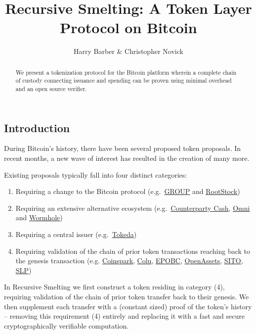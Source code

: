 \documentclass[9pt,oneside]{amsart}
\title{Recursive Smelting: A Token Layer Protocol on Bitcoin}
\author{Harry Barber \& Christopher Novick}
\begin{document}
\begin{abstract}
    We present a tokenization protocol for the Bitcoin platform wherein a complete chain of custody connecting issuance and spending can be proven using minimal overhead and an open source verifier.
\end{abstract}
\maketitle
\begin{multicols}{2}


\section{Introduction}
During Bitcoin's history, there have been several proposed token proposals. In recent months, a new wave of interest has resulted in the creation of many more.

Existing proposals typically fall into four distinct categories: \begin{enumerate}
    \item Requiring a change to the Bitcoin protocol (e.g.\ \href{https://docs.google.com/document/d/1X-yrqBJNj6oGPku49krZqTMGNNEWnUJBRFjX7fJXvTs}{GROUP} and \href{https://en.wikipedia.org/wiki/RootStock}{RootStock})
    \item Requiring an extensive alternative ecosystem (e.g.\ \href{https://counterparty.io/docs/protocol_specification/}{Counterparty Cash}, \href{https://github.com/OmniLayer/spec}{Omni} and \href{http://wormhole.cash}{Wormhole})
    \item Requiring a central issuer (e.g.\ \href{http://media.lokad.com/bitcoin/tokeda-2018-04-30.pdf}{Tokeda})
    \item Requiring validation of the chain of prior token transactions reaching back to the genesis transaction (e.g.
    \href{http://coinspark.org/}{Coinspark},
    \href{https://github.com/Colored-Coins/Colored-Coins-Protocol-Specification}{Colu},
    \href{https://github.com/chromaway/ngcccbase/wiki/EPOBC_simple}{EPOBC},
	\href{https://github.com/OpenAssets/open-assets-protocol/blob/master/specification.mediawiki}{OpenAssets},
   \href{https://github.com/awemany/sito}{SITO},
     \href{https://github.com/simpleledger/simple-ledger-protocol}{SLP})
\end{enumerate}

In Recursive Smelting we first construct a token residing in category (4), requiring validation of the chain of prior token transfer back to their genesis. We then supplement each transfer with a (constant sized) proof of the token's history -- removing this requirement (4) entirely and replacing it with a fast and secure cryptographically verifiable computation.


\end{multicols}
\end{document}
